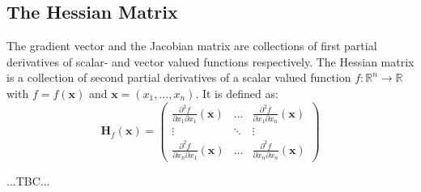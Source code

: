 
\subsection{The Hessian Matrix}
The gradient vector and the Jacobian matrix are collections of first partial derivatives of scalar- and vector valued functions respectively. The Hessian matrix is a collection of second partial derivatives of a scalar valued function $f: \mathbb{R}^n \rightarrow \mathbb{R}$ with $f = f(\mathbf{x})$ and $\mathbf{x} = (x_1, \ldots, x_n)$. It is defined as:
\begin{equation}
 \mathbf{H}_f(\mathbf{x}) = 
	\begin{pmatrix}
		  \frac{\partial^2 f}{\partial x_1 \partial x_1} (\mathbf{x}) 
		& \hdots 
		& \frac{\partial^2 f}{\partial x_1 \partial x_n} (\mathbf{x}) 
		\\
		\vdots & \ddots & \vdots 
		\\
	      \frac{\partial^2 f}{\partial x_n \partial x_1} (\mathbf{x}) 
		& \hdots 
		& \frac{\partial^2 f}{\partial x_n \partial x_n} (\mathbf{x})
	\end{pmatrix}
\end{equation}	


...TBC...







\begin{comment}


\subsection{TODO Notes}
It seems to be generally true that for any function $f(x)$ we have
\begin{equation}
 \frac{d}{d x} f(x) = \frac{d}{d h} f(x + h) \bigg\rvert_{h=0}
\end{equation}
which seems to generalize to the directional derivative of multivariate functions as:
\begin{equation}
 \frac{\partial f(\mathbf{x}) }{\partial \mathbf{v}} 
 = \lim_{h \rightarrow 0} \frac{f(\mathbf{x} + h \mathbf{v} ) - f(\mathbf{x})}{h}
 = \frac{d}{d h} f(\mathbf{x} + h \mathbf{v}) \bigg\rvert_{h=0}
\end{equation}
which could be used to actually evaluate the directional derivative without using the formula with the scalar product with the gradient. ...verify this! This seems to be the important observation in evaluating the Gateaux derivative by analogy later...



-maybe divergence, but maybe defer that to vector calculus
https://en.wikipedia.org/wiki/Del

\end{comment} 
